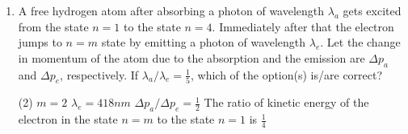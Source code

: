 
\begin{enumerate}
    \item A free hydrogen atom after absorbing a photon of wavelength \(\lambda_a\) gets excited from the state \(n = 1\) to the state \(n = 4\). Immediately after that the electron jumps to \(n = m\) state by emitting a photon of wavelength \(\lambda_e\). Let the change in momentum of the atom due to the absorption and the emission are \(\Delta p_a\) and \(\Delta p_e\), respectively. If \(\lambda_a/\lambda_e = \frac{1}{5}\), which of the option(s) is/are correct? \\ [Use \(hc = 1242 \ eV\ nm\); \(1 nm = 10^{-9}\) m; \(h\) and \(c\) are Planck's constant and speed of light, respectively.]
        \begin{tasks}(2)
            \task \(m = 2\)
            \task \(\lambda_e = 418 nm\)
            \task \(\Delta p_a/\Delta p_e = \frac{1}{2}\)
            \task The ratio of kinetic energy of the electron in the state \(n = m\) to the state \(n = 1\) is \(\frac{1}{4}\)
        \end{tasks}
\end{enumerate}
